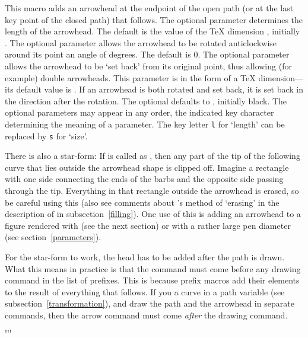\documentclass[letterpaper]{article}
\begin{document}
This macro adds an arrowhead at the endpoint of the open path (or at the
last key point of the closed path) that follows. The optional parameter
 determines the length of the arrowhead.  The default is
the value of the \TeX{} dimension , initially \dim{3pt}. The
optional parameter  allows the arrowhead to be rotated
anticlockwise around its point an angle of  degrees. The
default is 0. The optional parameter  allows the arrowhead
to be `set back' from its original point, thus allowing (for example)
double arrowheads. This parameter is in the form of a \TeX{}
dimension---its default value is \dim{0pt}. If an arrowhead is both
rotated and set back, it is set back in the direction after the
rotation. The optional  defaults to ,
initially black. The optional parameters may appear in any order, the
indicated key character determining the meaning of a parameter. The key
letter \texttt{l} for `length' can be replaced by \texttt{s} for `size'.

There is also a star-form: If  is called as , then
any part of the tip of the following curve that lies outside the
arrowhead shape is clipped off. Imagine a rectangle with one side
connecting the ends of the barbs and the opposite  side passing through
the tip. Everything in that rectangle outside the arrowhead is erased,
so be careful using this (also see comments about \MP{}'s method of
`erasing' in the description of  in
\cs{}subsection~\ref{filling}). One use of this is adding an arrowhead
to a figure rendered with  (see the next section) or with
a rather large pen diameter (see section~\ref{parameters}).

For the star-form to work, the head has to be added after the path is
drawn. What this means in practice is that the  command must
come before any drawing command in the list of prefixes. This is because
prefix macros add their elements to the result of everything that
follows. If you  a curve in a path variable (see
subsection~\ref{transformation}), and draw the path and the arrowhead in
separate commands, then the arrow command must come \emph{after} the
drawing command.

\begin{cd}
%
    $\ldots$\\
%
    $\ldots$\\
%
    $\ldots$%
%
%
\end{cd}
\end{document}
